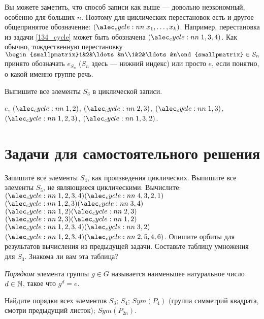 \documentclass[a4paper,12pt]{article}
\begin{document}
    Вы можете заметить, что способ записи как выше --- довольно неэкономный, особенно для больших $n$. Поэтому для циклических перестановок есть и другое общепринятое обозначение: $\cycle{x_1,\ldots,x_k}$. Например, перестановка из задачи \ref{134_cycle} может быть обозначена $\cycle{1,3,4}$. Как обычно, тождественную перестановку $\begin{smallpmatrix}1&2&\ldots&n\\1&2&\ldots&n\end{smallpmatrix} \in S_n$ принято обозначать $e_{S_n}$ ($S_n$ здесь --- нижний индекс) или просто $e$, если понятно, о какой именно группе речь.
    
    \problem Выпишите все элементы $S_3$ в циклической записи.
    \begin{solution}
        $e$, $\cycle{1,2}$, $\cycle{2,3}$, $\cycle{1,3}$, $\cycle{1,2,3}$, $\cycle{1,3,2}$.
    \end{solution}
    
    \section{Задачи для самостоятельного решения}
    
    \problem Запишите все элементы $S_4$, как произведения циклических.
    \problem Выпишите все элементы $S_5$, не являющиеся циклическими.
    \problem Вычислите: \\
    \sub $\cycle{1,2,3,4}\cycle{4,3,2,1}$ \\
    \sub $\cycle{1,2,3}\cycle{3,4}$ \\
    \sub $\cycle{1,2}\cycle{2,3}$ \\
    \sub $\cycle{2,3}\cycle{1,2}$ \\
    \sub $\cycle{1,2,3,4}\cycle{3,2}$ \\
    \sub $\cycle{1,2,3,4}\cycle{2,5,4,6}$.
     Опишите орбиты для результатов вычисления из предыдущей задачи.
     Составьте таблицу умножения для $S_3$. Знакома ли вам эта таблица?
    
     \emph{Порядком} элемента группы $g \in G$ называется наименьшее натуральное число $d \in \mathbb{N}$, такое что $g^d = e$.
    
    \problem Найдите порядки всех элементов \sub $S_3$;  $S_4$; \sub $Sym(P_4)$ (группа симметрий квадрата, смотри предыдущий листок);  $Sym(P_{2n})$.
\end{document}
